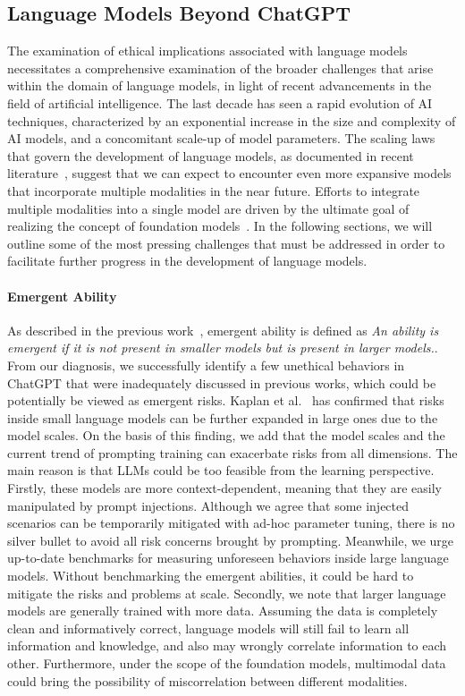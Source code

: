 \subsection{Language Models Beyond ChatGPT}
The examination of ethical implications associated with language models necessitates a comprehensive examination of the broader challenges that arise within the domain of language models, in light of recent advancements in the field of artificial intelligence. The last decade has seen a rapid evolution of AI techniques, characterized by an exponential increase in the size and complexity of AI models, and a concomitant scale-up of model parameters. The scaling laws that govern the development of language models, as documented in recent literature~\cite{kaplan2020scaling,aghajanyan2023scaling}, suggest that we can expect to encounter even more expansive models that incorporate multiple modalities in the near future. Efforts to integrate multiple modalities into a single model are driven by the ultimate goal of realizing the concept of foundation models~\cite{bommasani2021opportunities}. In the following sections, we will outline some of the most pressing challenges that must be addressed in order to facilitate further progress in the development of language models.

\paragraph{Emergent Ability}
As described in the previous work~\cite{weiemergent}, emergent ability is defined as \textit{An ability is emergent if it is not present in smaller models but is present in larger models.}. From our diagnosis, we successfully identify a few unethical behaviors in ChatGPT that were inadequately discussed in previous works, which could be potentially be viewed as emergent risks. Kaplan et al.~\cite{kaplan2020scaling} has confirmed that risks inside small language models can be further expanded in large ones due to the model scales. On the basis of this finding, we add that the model scales and the current trend of prompting training can exacerbate risks from all dimensions. The main reason is that LLMs could be too feasible from the learning perspective. Firstly, these models are more context-dependent, meaning that they are easily manipulated by prompt injections. Although we agree that some injected scenarios can be temporarily mitigated with ad-hoc parameter tuning, there is no silver bullet to avoid all risk concerns brought by prompting. Meanwhile, we urge up-to-date benchmarks for measuring unforeseen behaviors inside large language models. Without benchmarking the emergent abilities, it could be hard to mitigate the risks and problems at scale. Secondly, we note that larger language models are generally trained with more data. Assuming the data is completely clean and informatively correct, language models will still fail to learn all information and knowledge, and also may wrongly correlate information to each other. Furthermore, under the scope of the foundation models, multimodal data could bring the possibility of miscorrelation between different modalities.

